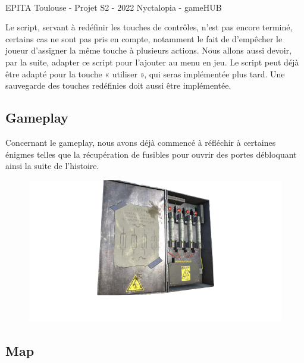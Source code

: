 \vfill
\noindent\makebox[\linewidth]{\rule{.8\paperwidth}{.6pt}}\\[0.2cm]
EPITA Toulouse - Projet S2 - 2022 \hfill Nyctalopia - gameHUB
\noindent\makebox[\linewidth]{\rule{.8\paperwidth}{.6pt}}

\newpage

Le script, servant à redéfinir les touches de contrôles, n’est pas encore terminé, certains cas ne sont pas pris en compte, notamment le fait de d’empêcher le joueur d’assigner la même touche à plusieurs actions. Nous allons aussi devoir, par la suite, adapter ce script pour l’ajouter au menu en jeu. Le script peut déjà être adapté pour la touche « utiliser », qui seras implémentée plus tard.
Une sauvegarde des touches redéfinies doit aussi être implémentée.

\subsection{Gameplay}

Concernant le gameplay, nous avons déjà commencé à réfléchir à certaines énigmes telles que la récupération de fusibles pour ouvrir des portes débloquant ainsi la suite de l’histoire.
\newline

\begin{figure}[H]
\centering
\begin{minipage}{.5\textwidth}
  \centering
  \centerline{\includegraphics[width=1.5\linewidth]{img/assets/fusibles.png}}
  \label{fig:fusebox}
\end{minipage}%
\end{figure}

\subsection{Map}

